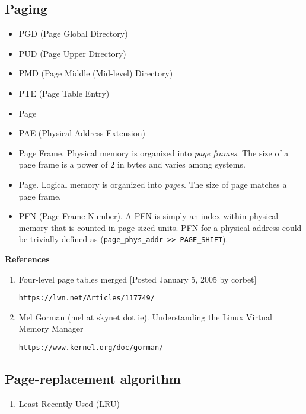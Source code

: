 \documentclass{article}
\begin{document}
\subsection{Paging}

\begin{itemize}
\item PGD (Page Global Directory)
\item PUD (Page Upper Directory)
\item PMD (Page Middle (Mid-level) Directory)
\item PTE (Page Table Entry)
\item Page
\end{itemize}

\begin{itemize}
\item PAE (Physical Address Extension)
\item Page Frame.  Physical memory is organized into \emph{page frames}.  The 
size of a page frame is a power of 2 in bytes and varies among systems.
\item Page.  Logical memory is organized into \emph{pages}. The size of page 
matches a page frame.
\item PFN (Page Frame Number).  A PFN is simply an index within physical memory 
that is counted in page-sized units. PFN for a physical address could be 
trivially defined as (\verb"page_phys_addr >> PAGE_SHIFT").
\end{itemize}

\textbf{References}

\begin{enumerate}
\item Four-level page tables merged [Posted January 5, 2005 by corbet]

	\texttt{https://lwn.net/Articles/117749/}

\item Mel Gorman (mel at skynet dot ie).  Understanding the Linux Virtual Memory Manager

	\texttt{https://www.kernel.org/doc/gorman/}
\end{enumerate}

\subsection{Page-replacement algorithm}

\begin{enumerate}

\item Least Recently Used (LRU)

\end{enumerate}
\end{document}
